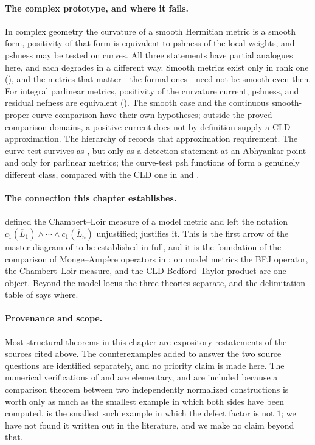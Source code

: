 \paragraph{The complex prototype, and where it fails.}
In complex geometry the curvature of a smooth Hermitian metric is a smooth
form, positivity of that form is equivalent to pshness of the local weights,
and pshness may be tested on curves.  All three statements have partial
analogues here, and each degrades in a different way.  Smooth metrics exist
only in rank one (), and the metrics
that matter---the formal ones---need not be smooth even then.
For integral parlinear metrics, positivity of the curvature current,
pshness, and residual nefness are equivalent
().  The smooth case and the continuous
smooth-proper-curve comparison have their own hypotheses; outside the
proved comparison domains, a positive current does not by definition
supply a CLD approximation.  The hierarchy of
 records that approximation requirement.  The curve test survives as
, but only as a detection statement at an
Abhyankar point and only for parlinear metrics; the curve-test psh functions
of \cite{GR25Classical,GR25PL} form a genuinely different class, compared
with the CLD one in  and
.

\paragraph{The connection this chapter establishes.}
 defined the Chambert--Loir measure of a model
metric and left the notation $c_1(\overline L_1)\wedge\cdots\wedge
c_1(\overline L_n)$ unjustified;  justifies it.
This is the first arrow of the master diagram of
 to be established in full, and it is the
foundation of the comparison of Monge--Amp\`ere operators in
: on model metrics the BFJ operator, the
Chambert--Loir measure, and the CLD Bedford--Taylor product are one object.
Beyond the model locus the three theories separate, and the delimitation
table of  says where.

\paragraph{Provenance and scope.}
Most structural theorems in this chapter are expository restatements of the
sources cited above.  The counterexamples added to answer the two source
questions are identified separately, and no priority claim is made here.
The numerical verifications of
 and  are elementary,
and are included because a comparison theorem between two independently
normalized constructions is worth only as much as the smallest example in
which both sides have been computed.   is the
smallest such example in which the defect factor is not $1$; we have not
found it written out in the literature, and we make no claim beyond that.
